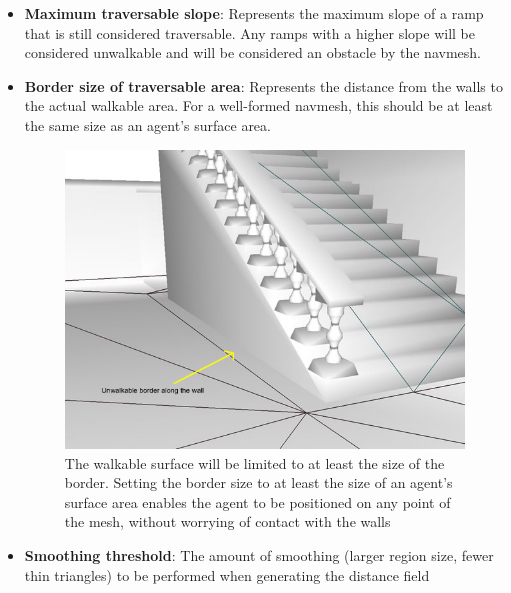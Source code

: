 \documentclass[a4paper,11pt]{article}
\begin{document}
\begin{itemize}
  \item\textbf{Maximum traversable slope}: Represents the maximum slope of a ramp that is still considered traversable. Any ramps with a higher slope will be considered unwalkable and will be considered an obstacle by the navmesh.
  
  \item\textbf{Border size of traversable area}: Represents the distance from the walls to the actual walkable area. For a well-formed navmesh, this should be at least the same size as an agent's surface area.
  
	\begin{figure}[H]
	\centering
	\includegraphics[width=1\textwidth]{border_trav_size.png}
	\caption{The walkable surface will be limited to at least the size of the border. Setting the border size to at least the size of an agent's surface area enables the agent to be positioned on any point of the mesh, without worrying of contact with the walls}
\end{figure} 

  
  \item\textbf{Smoothing threshold}: The amount of smoothing (larger region size, fewer thin triangles) to be performed when generating the distance field
  
%



\end{itemize}
\end{document}

